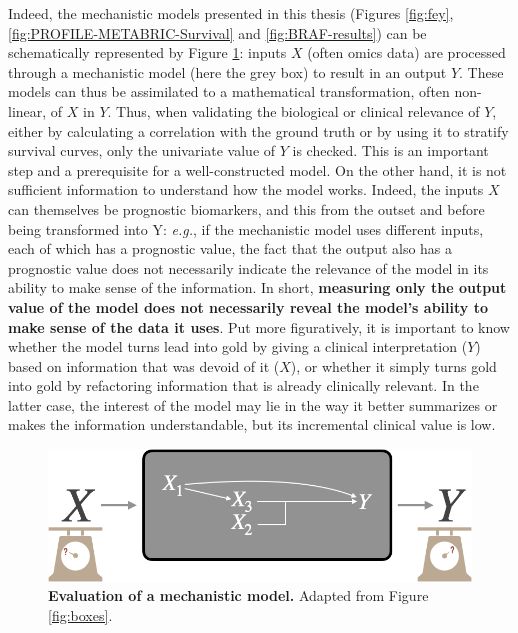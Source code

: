 \documentclass[a4paper,12pt,twoside,onecolumn,openright,final,oldfontcommands]{memoir}
\begin{document}
Indeed, the mechanistic models presented in this thesis (Figures
\ref{fig:fey}, \ref{fig:PROFILE-METABRIC-Survival} and
\ref{fig:BRAF-results}) can be schematically represented by Figure
\ref{fig:box-mech}: inputs \(X\) (often omics data) are processed
through a mechanistic model (here the grey box) to result in an output
\(Y\). These models can thus be assimilated to a mathematical
transformation, often non-linear, of \(X\) in \(Y\). Thus, when
validating the biological or clinical relevance of \(Y\), either by
calculating a correlation with the ground truth or by using it to
stratify survival curves, only the univariate value of \(Y\) is checked.
This is an important step and a prerequisite for a well-constructed
model. On the other hand, it is not sufficient information to understand
how the model works. Indeed, the inputs \(X\) can themselves be
prognostic biomarkers, and this from the outset and before being
transformed into Y: \emph{e.g.}, if the mechanistic model uses different
inputs, each of which has a prognostic value, the fact that the output
also has a prognostic value does not necessarily indicate the relevance
of the model in its ability to make sense of the information. In short,
\textbf{measuring only the output value of the model does not
necessarily reveal the model's ability to make sense of the data it
uses}. Put more figuratively, it is important to know whether the model
turns lead into gold by giving a clinical interpretation (\(Y\)) based
on information that was devoid of it (\(X\)), or whether it simply turns
gold into gold by refactoring information that is already clinically
relevant. In the latter case, the interest of the model may lie in the
way it better summarizes or makes the information understandable, but
its incremental clinical value is low.

\begin{figure}

{\centering \includegraphics[width=0.8\linewidth]{fig/box-mech} 

}

\caption[Evaluation of a mechanistic model]{\textbf{Evaluation of a mechanistic model.}
Adapted from Figure \ref{fig:boxes}.}\label{fig:box-mech}
\end{figure}
\end{document}
